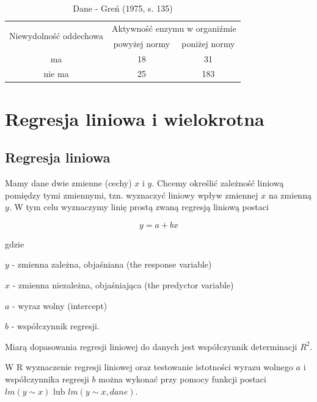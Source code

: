 \documentclass[12pt,B5paper,]{book}
\begin{document}
\begin{table}[H]
\centering
\caption{Dane - Greń (1975, s. 135)}
\label{gren135}
\begin{tabular}{ccc}
\hline
\multirow{2}{*}{Niewydolność oddechowa} & \multicolumn{2}{c}{Aktywność enzymu w organiźmie} \\
& powyżej normy            & poniżej normy            \\ \hline
ma      & 18         & 31          \\
nie ma      & 25          & 183  \\ \hline        
\end{tabular}
\end{table}

\chapter{Regresja liniowa i
wielokrotna}\label{regresja-liniowa-i-wielokrotna}

\section{Regresja liniowa}\label{regresja-liniowa}

Mamy dane dwie zmienne (cechy) \(x\) i \(y\). Chcemy określić zależność
liniową pomiędzy tymi zmiennymi, tzn. wyznaczyć liniowy wpływ zmiennej
\(x\) na zmienną \(y\). W tym celu wyznaczymy linię prostą zwaną
regresją liniową postaci

\begin{equation}
y = a+bx
\end{equation}

gdzie

\(y\) - zmienna zależna, objaśniana (the response variable)

\(x\) - zmienna niezależna, objaśniająca (the predyctor variable)

\(a\) - wyraz wolny (intercept)

\(b\) - współczynnik regresji.

\vspace{0.8cm} Miarą dopasowania regresji liniowej do danych jest
współczynnik determinacji \(R^2\).

W R wyznaczenie regresji liniowej oraz testowanie istotności wyrazu
wolnego \(a\) i współczynnika regresji \(b\) można wykonać przy pomocy
funkcji postaci \texttt{$lm(y \sim  x)$} lub
\texttt{$lm(y \sim x, dane)$}.

\newpage
\end{document}
